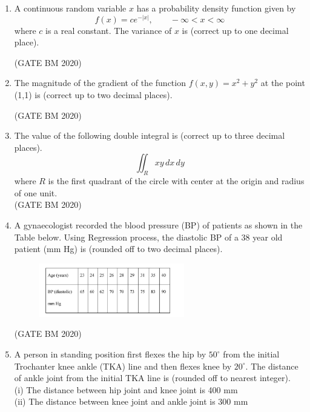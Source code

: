 \documentclass[journal]{IEEEtran}
\begin{document}
\begin{enumerate}
\item A continuous random variable $x$ has a probability density function given by
\[
f(x) = ce^{-|x|}, \qquad -\infty < x < \infty
\]
where $c$ is a real constant. The variance of $x$ is \underline{\hspace{2cm}} (correct up to one decimal place).


\hfill(GATE BM 2020)
\item The magnitude of the gradient of the function $f(x,y) = x^2 + y^2$ at the point (1,1) is \underline{\hspace{2cm}} (correct up to two decimal places).


	\hfill(GATE BM 2020)

\item The value of the following double integral is \underline{\hspace{3cm}} (correct up to three decimal places).
\[
\iint_R xy \, dx\,dy
\]
where $R$ is the first quadrant of the circle with center at the origin and radius of one unit. \\


\hfill(GATE BM 2020)
\item A gynaecologist recorded the blood pressure (BP) of patients as shown in the Table below. Using Regression process, the diastolic BP of a 38 year old patient (mm Hg) is \underline{\hspace{3cm}} (rounded off to two decimal places).


    \begin{figure}[H]
    \centering
\includegraphics[width=0.6\textwidth]{Screenshot_2025_0822_171940.png}
\caption{}
    \label{fig:Q60}
\end{figure}


\hfill(GATE BM 2020)
\item A person in standing position first flexes the hip by $50^\circ$ from the initial Trochanter knee ankle (TKA) line and then flexes knee by $20^\circ$. The distance of ankle joint from the initial TKA line is \underline{\hspace{3cm}} (rounded off to nearest integer). \\
(i) The distance between hip joint and knee joint is 400 mm \\
(ii) The distance between knee joint and ankle joint is 300 mm \\



\end{enumerate}
\end{document}
